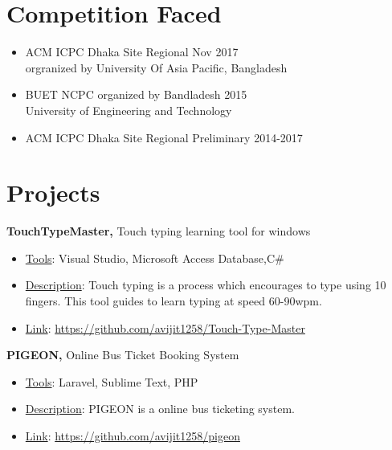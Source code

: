 \documentclass[margin]{res}
\begin{document}
\begin{resume}
\section{Competition Faced}
\begin{itemize} \itemsep -2pt
                 \item  ACM ICPC Dhaka Site Regional   \hfill Nov 2017 \\  
                orgranized by University Of Asia Pacific, Bangladesh
                 \item  BUET NCPC organized by Bandladesh \hfill 2015\\
                 University of Engineering and Technology
                 \item  ACM ICPC Dhaka Site Regional Preliminary  \hfill 2014-2017 \\  
                
     \end{itemize}

\iffalse
\section{Projects} 
               {\bf TouchTypeMaster,} Touch typing learning tool for windows   
                \begin{itemize} \itemsep -2pt
              \item \underline{Tools}:  Visual Studio, Microsoft Access Database,C\#                 
                \item  \underline{Description}:  Touch typing is a process which encourages to type using 10 fingers. This tool guides to learn typing at speed 60-90wpm. 

                \item \underline{Link}: \url{https://github.com/avijit1258/Touch-Type-Master}

		 \end{itemize}

		{\bf PIGEON,} Online Bus Ticket Booking System  
                \begin{itemize} \itemsep -2pt
                 \item  \underline{Tools}:  Laravel, Sublime Text, PHP 
                 \item  \underline{Description}:  PIGEON is a online bus ticketing  
                 system. 
                  \item \underline{Link}: \url{https://github.com/avijit1258/pigeon}                
                  

\end{itemize}
\end{resume}
\end{document}
